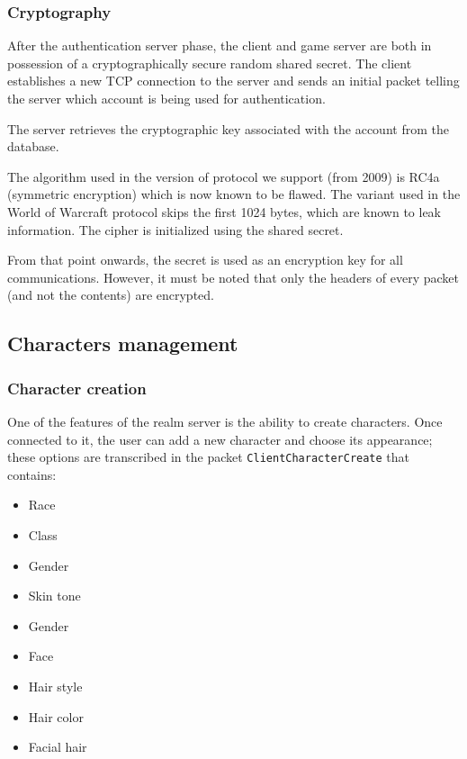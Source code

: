 \documentclass[paper=a4, fontsize=11pt]{scrartcl}
\begin{document}
\subsubsection{Cryptography}

After the authentication server phase, the client and game server are both in
possession of a cryptographically secure random shared secret.
The client establishes a new TCP connection to the server and sends an initial
packet telling the server which account is being used for authentication.

The server retrieves the cryptographic key associated with the account from the
database.

The algorithm used in the version of protocol we support (from
2009) is RC4a (symmetric encryption) which is now known to be flawed.
The variant used in the World of Warcraft protocol skips the first 1024 bytes,
which are known to leak information.
The cipher is initialized using the shared secret.

From that point onwards, the secret is used as an encryption key for all
communications.
However, it must be noted that only the headers of every packet
(and not the contents) are encrypted.

\subsection{Characters management}

\subsubsection{Character creation}

One of the features of the realm server is the ability to create characters.
Once connected to it, the user can add a new character and choose its appearance; 
these options are transcribed in the packet \texttt{ClientCharacterCreate} that
contains:
\begin{multicols}{2}
\begin{itemize}
    \item Race
    \item Class
    \item Gender
    \item Skin tone
    \item Gender
    \item Face
    \item Hair style
    \item Hair color
    \item Facial hair
\end{itemize}
\end{multicols}
\end{document}
